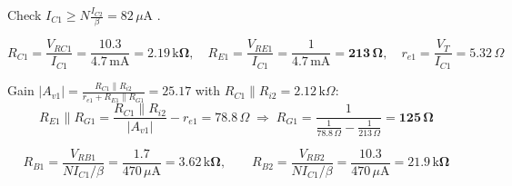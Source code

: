 \documentclass[11pt]{article}
\begin{document}
Check $I_{C1} \ge N\frac{I_{C2}}{\beta} = 82\,\mu \mathrm{A}$ \checkmark. 

\[R_{C1} = \frac{V_{RC1}}{I_{C1}} = \frac{10.3}{4.7\,\mathrm{m}\mathrm{A}} = \mathbf{2.19\,\mathrm{k}\Omega},\quad R_{E1} = \frac{V_{RE1}}{I_{C1}} = \frac{1}{4.7\,\mathrm{m}\mathrm{A}} = \mathbf{213\,\Omega},\quad r_{e1} = \frac{V_T}{I_{C1}} = 5.32\,\Omega\]

Gain $|A_{v1}| = \frac{R_{C1}\|R_{i2}}{r_{e1} + R_{E1}\|R_{G1}} = 25.17$ with $R_{C1}\|R_{i2} = 2.12\,\mathrm{k}\Omega$:\[R_{E1}\|R_{G1} = \frac{R_{C1}\|R_{i2}}{|A_{v1}|} - r_{e1} = 78.8\,\Omega \;\Rightarrow\; R_{G1} = \frac{1}{\frac{1}{78.8\,\Omega} - \frac{1}{213\,\Omega}} = \mathbf{125\,\Omega}\]

\[R_{B1} = \frac{V_{RB1}}{N I_{C1}/\beta} = \frac{1.7}{470\,\mu \mathrm{A}} = \mathbf{3.62\,\mathrm{k}\Omega},\qquad R_{B2} = \frac{V_{RB2}}{N I_{C1}/\beta} = \frac{10.3}{470\,\mu \mathrm{A}} = \mathbf{21.9\,\mathrm{k}\Omega}\]
\end{document}
